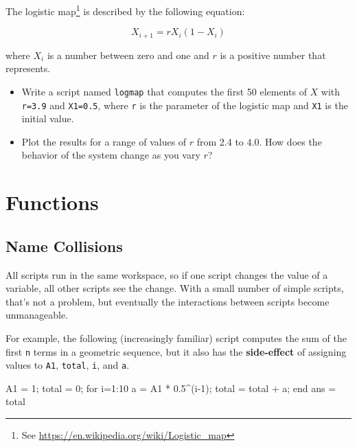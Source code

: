 \documentclass[
]{book}
\numberwithin{Answer}{chapter}
\numberwithin{Exercise}{chapter}
\begin{document}
\begin{ex}
The logistic map\footnote{See \url{https://en.wikipedia.org/wiki/Logistic_map}} is described by the following equation:


\begin{equation}
X_{i+1} = r X_i (1-X_i)
\end{equation}

where $X_i$ is a number between zero and one and $r$ is a positive number that represents.

\begin{itemize}

\item Write a script named {\tt logmap} that computes the first 50
elements of $X$ with {\tt r=3.9} and {\tt X1=0.5}, where
{\tt r} is the parameter of the logistic map and {\tt X1} is the
initial value.

\item Plot the results for a range of values of $r$ from 2.4 to 4.0.
How does the behavior of the system change as you vary $r$?

\end{itemize}

\end{ex}


\chapter{Functions}

\section{Name Collisions}


All scripts run in the same workspace, so if one script changes the value of a variable, all other scripts see the change.  With a small number of simple scripts, that's not a problem, but eventually the interactions between scripts become unmanageable.

For example, the following (increasingly familiar) script computes the
sum of the first {\tt n} terms in a geometric sequence, but it also
has the {\bf side-effect} of assigning values to {\tt A1}, {\tt total},
{\tt i}, and {\tt a}.

\begin{code}
A1 = 1;
total = 0;
for i=1:10
    a = A1 * 0.5^(i-1);
    total = total + a;
end
ans = total
\end{code}
\end{document}
